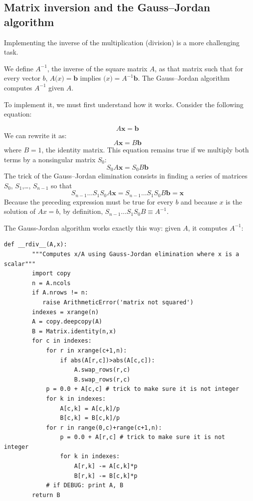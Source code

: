 \documentclass[justified,sixbynine]{tufte-book}
\def\ft{\small\tt}
\theoremstyle{plain}%
\theoremstyle{definition}
\theoremstyle{remark}
\begin{document}
\begin{fullwidth}
\goodbreak\subsection{Matrix inversion and the Gauss--Jordan algorithm}


Implementing the inverse of the multiplication (division) is a more challenging task.

We define $A^{-1}$, the inverse of the square matrix $A$, as that matrix such that for every vector $b$, $A\mathbf(x)=\mathbf{b}$ implies $\mathbf(x)=A^{-1}\mathbf{b}$. The Gauss--Jordan algorithm computes $A^{-1}$ given $A$.

To implement it, we must first understand how it works. Consider the following equation:

\begin{equation}
A \mathbf{x} = \mathbf{b}
\end{equation}
We can rewrite it as:
\begin{equation}
A \mathbf{x} = B \mathbf{b}
\end{equation}
where $B=1$, the identity matrix. This equation remains true if we multiply both terms by a nonsingular matrix $S_0$:
\begin{equation}
S_0 A \mathbf{x} = S_0 B \mathbf{b}
\end{equation}
The trick of the Gauss--Jordan elimination consists in finding a series of matrices $S_0$, $S_1$,\dots, $S_{n-1}$ so that
\begin{equation}
S_{n-1} \dots S_1 S_0 A \mathbf{x} = S_{n-1} \dots S_1 S_0 B \mathbf{b} = \mathbf{x}
\end{equation}
Because the preceding expression must be true for every $b$ and because $x$ is the solution of $A x=b$, by definition,
$S_{n-1} \dots S_1 S_0 B \equiv A^{-1}$.

The Gauss-Jordan algorithm works exactly this way: given $A$, it computes $A^{-1}$:

\begin{lstlisting}[caption={in file: {\ft nlib.py}}]
    def __rdiv__(A,x):
        """Computes x/A using Gauss-Jordan elimination where x is a scalar"""
        import copy
        n = A.ncols
        if A.nrows != n:
           raise ArithmeticError('matrix not squared')
        indexes = xrange(n)
        A = copy.deepcopy(A)
        B = Matrix.identity(n,x)
        for c in indexes:
            for r in xrange(c+1,n):
                if abs(A[r,c])>abs(A[c,c]):
                    A.swap_rows(r,c)
                    B.swap_rows(r,c)
            p = 0.0 + A[c,c] # trick to make sure it is not integer
            for k in indexes:
                A[c,k] = A[c,k]/p
                B[c,k] = B[c,k]/p
            for r in range(0,c)+range(c+1,n):
                p = 0.0 + A[r,c] # trick to make sure it is not integer
                for k in indexes:
                    A[r,k] -= A[c,k]*p
                    B[r,k] -= B[c,k]*p
            # if DEBUG: print A, B
        return B


\end{lstlisting}
\end{fullwidth}
\end{document}
